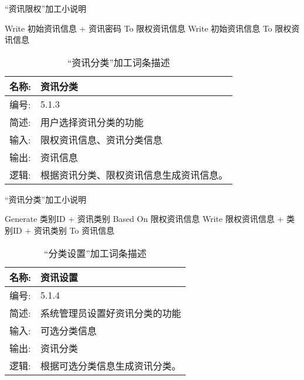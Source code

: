 \begin{algorithm}[H]
    \renewcommand{\thealgorithm}{}
    \caption{“资讯限权”加工小说明} 
    \label{alg3} 
    \begin{algorithmic}[1]
        \STATE Write 初始资讯信息 + 资讯密码 To 限权资讯信息
        \ELSE
        \STATE Write 初始资讯信息 To 限权资讯信息
        \ENDIF
    \end{algorithmic} 
\end{algorithm}


\begin{table}[H]  
\caption{“资讯分类”加工词条描述}  
\begin{center}  
    \begin{tabular}{l p{11cm}} 
        \hline
        \quad 名称:  &  资讯分类 \\
        \hline
        \quad 编号:  & 5.1.3 \\
        \hline
        \quad 简述:  & 用户选择资讯分类的功能 \\
        \hline
        \quad 输入:  & 限权资讯信息、资讯分类信息 \\
        \hline
        \quad 输出:  & 资讯信息 \\
        \hline
        \quad 逻辑:  & 根据资讯分类、限权资讯信息生成资讯信息。 \\
        \hline
    \end{tabular}
    \label{tab1}
\end{center}
\end{table}

\begin{algorithm}[H]
    \renewcommand{\thealgorithm}{}
    \caption{“资讯分类”加工小说明} 
    \label{alg3} 
    \begin{algorithmic}[1]
        \STATE Generate 类别ID + 资讯类别 Based On 限权资讯信息
        \STATE Write 限权资讯信息 + 类别ID + 资讯类别 To 资讯信息
    \end{algorithmic} 
\end{algorithm}

\begin{table}[H]  
\caption{“分类设置”加工词条描述}  
\begin{center}  
    \begin{tabular}{l p{11cm}} 
        \hline
        \quad 名称:  & 资讯设置 \\
        \hline
        \quad 编号:  & 5.1.4\\
        \hline
        \quad 简述:  & 系统管理员设置好资讯分类的功能 \\
        \hline
        \quad 输入:  & 可选分类信息 \\
        \hline
        \quad 输出:  & 资讯分类 \\
        \hline
        \quad 逻辑:  & 根据可选分类信息生成资讯分类。 \\
        \hline
    \end{tabular}
    \label{tab1}
\end{center}
\end{table}

